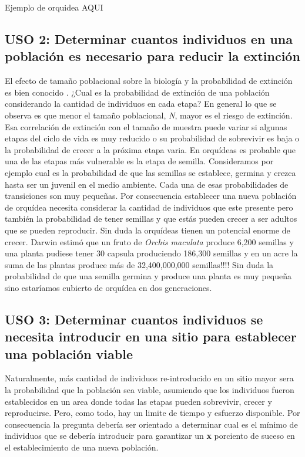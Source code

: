 \documentclass[
]{book}
\theoremstyle{definition}
\theoremstyle{definition}
\theoremstyle{definition}
\theoremstyle{definition}
\theoremstyle{remark}
\begin{document}
Ejemplo de orquidea AQUI

\subsection{USO 2: Determinar cuantos individuos en una población es necesario para reducir la extinción}\label{uso-2-determinar-cuantos-individuos-en-una-poblaciuxf3n-es-necesario-para-reducir-la-extinciuxf3n}

El efecto de tamaño poblacional sobre la biología y la probabilidad de extinción es bien conocido \citep{shaffer1985population, nunney1993assessing, harris2022abundance}. ¿Cual es la probabilidad de extinción de una población considerando la cantidad de individuos en cada etapa? En general lo que se observa es que menor el tamaño poblacional, \emph{N}, mayor es el riesgo de extinción. Esa correlación de extinción con el tamaño de muestra puede variar si algunas etapas del ciclo de vida es muy reducido o su probabilidad de sobrevivir es baja o la probabilidad de crecer a la próxima etapa varia. En orquídeas es probable que una de las etapas más vulnerable es la etapa de semilla. Consideramos por ejemplo cual es la probabilidad de que las semillas se establece, germina y crezca hasta ser un juvenil en el medio ambiente. Cada una de esas probabilidades de transiciones son muy pequeñas. Por consecuencia establecer una nueva población de orquídea necesita considerar la cantidad de individuos que este presente pero también la probabilidad de tener semillas y que estás pueden crecer a ser adultos que se pueden reproducir. Sin duda la orquídeas tienen un potencial enorme de crecer. Darwin \citep{darwin1877various} estimó que un fruto de \emph{Orchis maculata} produce 6,200 semillas y una planta pudiese tener 30 capsula produciendo 186,300 semillas y en un acre la suma de las plantas produce más de 32,400,000,000 semillas!!!! Sin duda la probabilidad de que una semilla germina y produce una planta es muy pequeña sino estaríamos cubierto de orquídea en dos generaciones.

\subsection{USO 3: Determinar cuantos individuos se necesita introducir en una sitio para establecer una población viable}\label{uso-3-determinar-cuantos-individuos-se-necesita-introducir-en-una-sitio-para-establecer-una-poblaciuxf3n-viable}

Naturalmente, más cantidad de individuos re-introducido en un sitio mayor sera la probabilidad que la población sea viable, asumiendo que los individuos fueron establecidos en un area donde todas las etapas pueden sobrevivir, crecer y reproducirse. Pero, como todo, hay un limite de tiempo y esfuerzo disponible. Por consecuencia la pregunta debería ser orientado a determinar cual es el mínimo de individuos que se debería introducir para garantizar un \textbf{x} porciento de suceso en el establecimiento de una nueva población.
\end{document}
